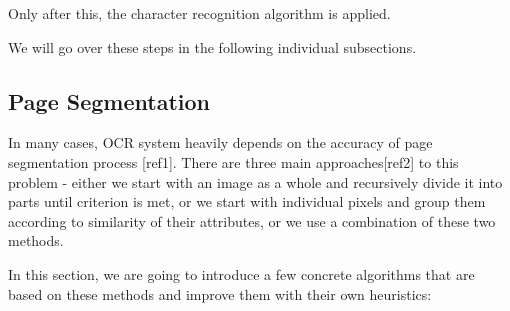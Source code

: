 Only after this, the character recognition algorithm is applied.

We will go over these steps in the following individual subsections.

\subsection{Page Segmentation}

In many cases, OCR system heavily depends on the accuracy of page segmentation process [ref1]. There are three main approaches[ref2] to this problem - either we start with an image as a whole and recursively divide it into parts until criterion is met, or we start with individual pixels and group them according to similarity of their attributes, or we use a combination of these two methods.

In this section, we are going to introduce a few concrete algorithms that are based on these methods and improve them with their own heuristics:

